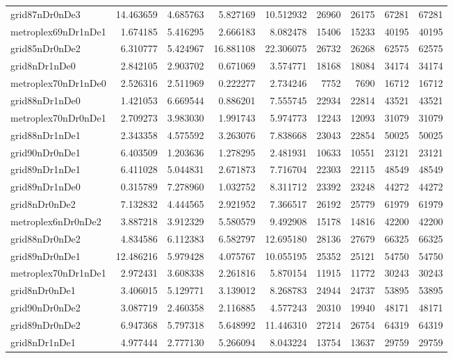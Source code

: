 \begin{longtable}{|l|r|r|r|r|r|r|r|r|}
grid87nDr0nDe3 & 14.463659 & 4.685763 & 5.827169 & 10.512932 & 26960 & 26175 & 67281 & 67281 \\
metroplex69nDr1nDe1 & 1.674185 & 5.416295 & 2.666183 & 8.082478 & 15406 & 15233 & 40195 & 40195 \\
grid85nDr0nDe2 & 6.310777 & 5.424967 & 16.881108 & 22.306075 & 26732 & 26268 & 62575 & 62575 \\
grid8nDr1nDe0 & 2.842105 & 2.903702 & 0.671069 & 3.574771 & 18168 & 18084 & 34174 & 34174 \\
metroplex70nDr1nDe0 & 2.526316 & 2.511969 & 0.222277 & 2.734246 & 7752 & 7690 & 16712 & 16712 \\
grid88nDr1nDe0 & 1.421053 & 6.669544 & 0.886201 & 7.555745 & 22934 & 22814 & 43521 & 43521 \\
metroplex70nDr0nDe1 & 2.709273 & 3.983030 & 1.991743 & 5.974773 & 12243 & 12093 & 31079 & 31079 \\
grid88nDr1nDe1 & 2.343358 & 4.575592 & 3.263076 & 7.838668 & 23043 & 22854 & 50025 & 50025 \\
grid90nDr0nDe1 & 6.403509 & 1.203636 & 1.278295 & 2.481931 & 10633 & 10551 & 23121 & 23121 \\
grid89nDr1nDe1 & 6.411028 & 5.044831 & 2.671873 & 7.716704 & 22303 & 22115 & 48549 & 48549 \\
grid89nDr1nDe0 & 0.315789 & 7.278960 & 1.032752 & 8.311712 & 23392 & 23248 & 44272 & 44272 \\
grid8nDr0nDe2 & 7.132832 & 4.444565 & 2.921952 & 7.366517 & 26192 & 25779 & 61979 & 61979 \\
metroplex6nDr0nDe2 & 3.887218 & 3.912329 & 5.580579 & 9.492908 & 15178 & 14816 & 42200 & 42200 \\
grid88nDr0nDe2 & 4.834586 & 6.112383 & 6.582797 & 12.695180 & 28136 & 27679 & 66325 & 66325 \\
grid89nDr0nDe1 & 12.486216 & 5.979428 & 4.075767 & 10.055195 & 25352 & 25121 & 54750 & 54750 \\
metroplex70nDr1nDe1 & 2.972431 & 3.608338 & 2.261816 & 5.870154 & 11915 & 11772 & 30243 & 30243 \\
grid8nDr0nDe1 & 3.406015 & 5.129771 & 3.139012 & 8.268783 & 24944 & 24737 & 53895 & 53895 \\
grid90nDr0nDe2 & 3.087719 & 2.460358 & 2.116885 & 4.577243 & 20310 & 19940 & 48171 & 48171 \\
grid89nDr0nDe2 & 6.947368 & 5.797318 & 5.648992 & 11.446310 & 27214 & 26754 & 64319 & 64319 \\
grid8nDr1nDe1 & 4.977444 & 2.777130 & 5.266094 & 8.043224 & 13754 & 13637 & 29759 & 29759 \\

\end{longtable}
